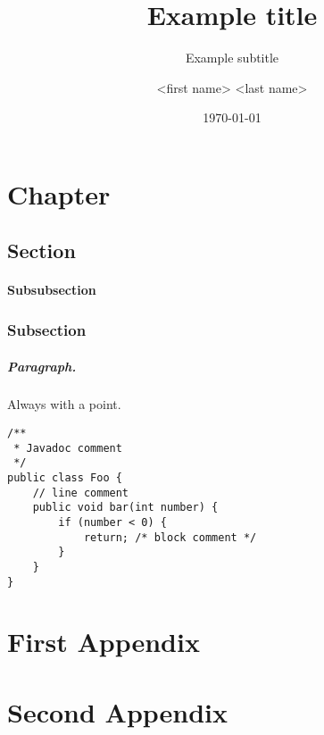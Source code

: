 \documentclass{hasel_thesis}
\date{\today}
\title{Example title}
\subtitle{Example subtitle}
\author{<first name> <last name>}
\begin{document}
\maketitle

\frontmatter

\begin{acknowledgements}
\end{acknowledgements}

\begin{abstract}
\end{abstract}

\begin{zusammenfassung}
\end{zusammenfassung}

\tableofcontents
\listoffigures
\listoftables
\lstlistoflistings

\mainmatter
\chapter{Chapter}
\section{Section}
%
\subsubsection{Subsubsection}

\subsection{Subsection}
%
\paragraph{Paragraph.} Always with a point.

\begin{lstlisting}[caption=An example code snippet]
/**
 * Javadoc comment
 */
public class Foo {
	// line comment
	public void bar(int number) {
		if (number < 0) {
			return; /* block comment */
		}
	}
}
\end{lstlisting}

\appendix
\chapter{First Appendix}
\chapter{Second Appendix}

\backmatter


\end{document}
